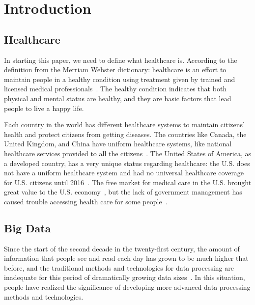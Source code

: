 \section{Introduction}
\subsection{Healthcare}
In starting this paper, we need to define what healthcare is. According 
to the definition from the Merriam Webster dictionary: healthcare is an 
effort to maintain people in a healthy condition using treatment given by 
trained and licensed medical professionals~\cite{def_hc}. 
The healthy condition indicates that both 
physical and mental status are healthy, and they are basic 
factors that lead people to live a happy life. 

Each country in the world has different healthcare systems to 
maintain citizens' health and protect citizens from getting diseases. 
The countries like Canada, the United Kingdom, and China have 
uniform healthcare systems, like national healthcare services 
provided to all the citizens~\cite{ca_hc, uk_hc, cn_hc}. The 
United States of America, as a developed country, has a very unique 
status regarding healthcare: the U.S. does not have a uniform healthcare 
system and had no universal healthcare coverage for U.S. citizens until 
2016~\cite{us_hc}. The free market for medical care in the U.S. brought 
great value to the U.S. economy~\cite{us_hccost}, but the lack of 
government management has caused trouble accessing health care 
for some people~\cite{us_hcs}.

\subsection{Big Data}
Since the start of the second decade in the twenty-first century, 
the amount of information that people see and read each day has 
grown to be much higher that before, 
and the traditional methods and technologies for data processing are 
inadequate for this period of dramatically growing data 
sizes~\cite{Moura}. In this situation, people have realized the 
significance of developing more advanced data processing methods 
and technologies. 


